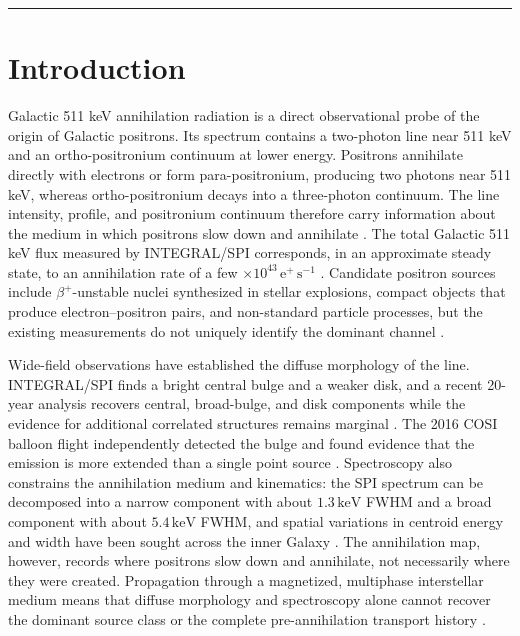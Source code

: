 \documentclass[11pt]{article}
\newcommand{\keV}{\ensuremath{\,\mathrm{keV}}}
\begin{document}
\vspace{0.3em}
\noindent\rule{\textwidth}{0.4pt}
\vspace{1.0em}

\section{Introduction}
\label{sec:introduction}

Galactic 511 keV annihilation radiation is a direct observational probe of the
origin of Galactic positrons. Its spectrum contains a two-photon line near
511 keV and an ortho-positronium continuum at lower energy. Positrons annihilate
directly with electrons or form para-positronium, producing two photons near
511 keV, whereas ortho-positronium decays into a three-photon continuum. The
line intensity, profile, and positronium continuum therefore carry information
about the medium in which positrons slow down and annihilate
\cite{Prantzos2011,Jean2006}. The total Galactic 511 keV flux measured by
INTEGRAL/SPI corresponds, in an approximate steady state, to an annihilation
rate of a few $\times10^{43}\,\mathrm{e^+\,s^{-1}}$
\cite{Prantzos2011,Kierans2020}. Candidate positron sources include
$\beta^+$-unstable nuclei synthesized in stellar explosions, compact objects
that produce electron--positron pairs, and non-standard particle processes, but
the existing measurements do not uniquely identify the dominant channel
\cite{Prantzos2011,Siegert2016AA,Siegert2016V404}.

Wide-field observations have established the diffuse morphology of the line.
INTEGRAL/SPI finds a bright central bulge and a weaker disk, and a recent
20-year analysis recovers central, broad-bulge, and disk components while the
evidence for additional correlated structures remains marginal
\cite{Knodlseder2005AllSky,Siegert2016AA,Yoneda2025}. The 2016 COSI balloon flight independently
detected the bulge and found evidence that the emission is more extended than a
single point source \cite{Kierans2020,Siegert2020COSI}. Spectroscopy also
constrains the annihilation medium and kinematics: the SPI spectrum can be
decomposed into a narrow component with about $1.3\keV$ FWHM and a broad
component with about $5.4\keV$ FWHM, and spatial variations in centroid energy
and width have been sought across the inner Galaxy
\cite{Jean2006,Siegert2019Kinematics}. The annihilation map, however, records
where positrons slow down and annihilate, not necessarily where they were
created. Propagation through a magnetized, multiphase interstellar medium means
that diffuse morphology and spectroscopy alone cannot recover the dominant
source class or the complete pre-annihilation transport history
\cite{Prantzos2011}.
\end{document}
